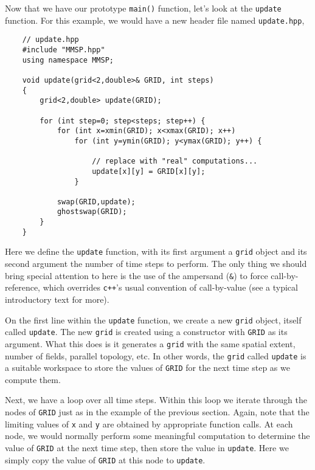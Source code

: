 Now that we have our prototype {\tt main()} function, let's look at the {\tt update} function.  For this example, we would have a new header file named {\tt update.hpp},
\begin{shadebox}
\begin{verbatim}
    // update.hpp
    #include "MMSP.hpp"
    using namespace MMSP;

    void update(grid<2,double>& GRID, int steps)
    {
        grid<2,double> update(GRID);

        for (int step=0; step<steps; step++) {
            for (int x=xmin(GRID); x<xmax(GRID); x++)
                for (int y=ymin(GRID); y<ymax(GRID); y++) {

                    // replace with "real" computations...
                    update[x][y] = GRID[x][y];
                }

            swap(GRID,update);
            ghostswap(GRID);
        }
    }
\end{verbatim}
\end{shadebox}
Here we define the {\tt update} function, with its first argument a {\tt grid} object and its second argument the number of time steps to perform.  The only thing we should bring special attention to here is the use of the ampersand ({\tt \&}) to force call-by-reference, which overrides {\tt c++}'s usual convention of call-by-value (see a typical introductory text for more).

On the first line within the {\tt update} function, we create a new {\tt grid} object, itself called {\tt update}.  The new {\tt grid} is created using a constructor with {\tt GRID} as its argument.  What this does is it generates a {\tt grid} with the same spatial extent, number of fields, parallel topology, etc.  In other words, the {\tt grid} called {\tt update} is a suitable workspace to store the values of {\tt GRID} for the next time step as we compute them.

Next, we have a loop over all time steps.  Within this loop we iterate through the nodes of {\tt GRID} just as in the example of the previous section.  Again, note that the limiting values of {\tt x} and {\tt y} are obtained by appropriate function calls.  At each node, we would normally perform some meaningful computation to determine the value of {\tt GRID} at the next time step, then store the value in {\tt update}.  Here we simply copy the value of {\tt GRID} at this node to {\tt update}.

